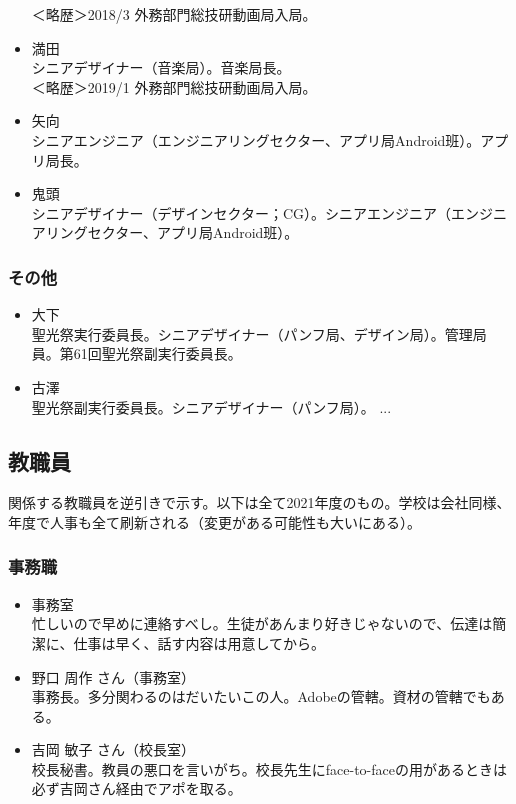 \documentclass[dvipdfmx,jb5]{jarticle}
\begin{document}
\begin{itemize}
  ＜略歴＞2018/3 外務部門総技研動画局入局。
  \item 満田\\
  シニアデザイナー（音楽局）。音楽局長。\\
  ＜略歴＞2019/1 外務部門総技研動画局入局。
  \item 矢向\\
  シニアエンジニア（エンジニアリングセクター、アプリ局Android班）。アプリ局長。
  \item 鬼頭\\
  シニアデザイナー（デザインセクター；CG）。シニアエンジニア（エンジニアリングセクター、アプリ局Android班）。
\end{itemize}
\subsubsection{その他}
\begin{itemize}
  \item 大下\\
  聖光祭実行委員長。シニアデザイナー（パンフ局、デザイン局）。管理局員。第61回聖光祭副実行委員長。
  \item 古澤\\
  聖光祭副実行委員長。シニアデザイナー（パンフ局）。
  ...
\end{itemize}
\subsection{教職員}
関係する教職員を逆引きで示す。以下は全て2021年度のもの。学校は会社同様、年度で人事も全て刷新される（変更がある可能性も大いにある）。
\subsubsection{事務職}
\begin{itemize}
  \item 事務室\\
  忙しいので早めに連絡すべし。生徒があんまり好きじゃないので、伝達は簡潔に、仕事は早く、話す内容は用意してから。
  \item 野口 周作 さん（事務室）\\
  事務長。多分関わるのはだいたいこの人。Adobeの管轄。資材の管轄でもある。
  \item 吉岡 敏子 さん（校長室）\\
  校長秘書。教員の悪口を言いがち。校長先生にface-to-faceの用があるときは必ず吉岡さん経由でアポを取る。
\end{itemize}
\end{document}
